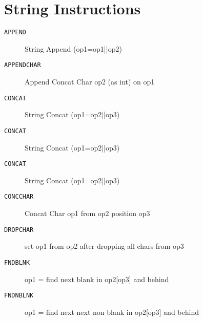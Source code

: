 \section{String Instructions}
\begin{description}
\item[\texttt{APPEND     }]  String Append (op1=op1||op2)\\
\end{description}

\begin{description}
\item[\texttt{APPENDCHAR }]  Append Concat Char op2 (as int) on op1\\
\end{description}

\begin{description}
\item[\texttt{CONCAT     }]  String Concat (op1=op2||op3)\\
\end{description}

\begin{description}
\item[\texttt{CONCAT     }]  String Concat (op1=op2||op3)\\
\end{description}

\begin{description}
\item[\texttt{CONCAT     }]  String Concat (op1=op2||op3)\\
\end{description}

\begin{description}
\item[\texttt{CONCCHAR   }]  Concat Char op1 from op2 position op3\\
\end{description}

\begin{description}
\item[\texttt{DROPCHAR   }]  set op1 from op2 after dropping all chars from op3\\
\end{description}

\begin{description}
\item[\texttt{FNDBLNK    }]  op1 = find next blank in op2[op3] and behind\\
\end{description}

\begin{description}
\item[\texttt{FNDNBLNK   }]  op1 = find next next non blank in op2[op3] and behind\\
\end{description}
